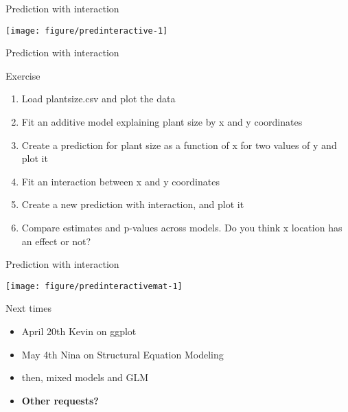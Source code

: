 \documentclass[10pt]{beamer}\usepackage[]{graphicx}\usepackage[]{color}
\newenvironment{knitrout}{}{} %
\begin{document}
  \begin{frame}[fragile]{Prediction with interaction}

\begin{knitrout}\small
{}\color{fgcolor}
\texttt{[image: figure/predinteractive-1]} 

\end{knitrout}

\end{frame}

\begin{frame}[fragile]{Prediction with interaction}
  \begin{exampleblock}{Exercise}
    \begin{enumerate}
      \item Load plantsize.csv and plot the data
      \item Fit an additive model explaining plant size by x and y coordinates
     \item Create a prediction for plant size as a function of x for two values of y and plot it
     \item Fit an interaction between x and y coordinates
     \item Create a new prediction with interaction, and plot it
     \item Compare estimates and p-values across models. Do you think x location has an effect or not?
    \end{enumerate}
  \end{exampleblock}
\end{frame}

  \begin{frame}[fragile]{Prediction with interaction}

\begin{knitrout}\small
{}\color{fgcolor}
\texttt{[image: figure/predinteractivemat-1]} 

\end{knitrout}

\end{frame}

\begin{frame}{Next times}
  \begin{itemize}  
    \item April 20th Kevin on ggplot
    \item May 4th Nina on Structural Equation Modeling
    \item then, mixed models and GLM
    \item \textbf{Other requests?}
  \end{itemize}
\end{frame}
\end{document}
